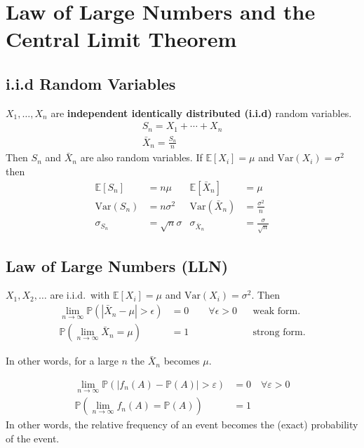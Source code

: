 \newcol{}
\section{Law of Large Numbers and the Central Limit Theorem}

\subsection{i.i.d Random Variables}

$X_1, \ldots , X_n$ are \textbf{independent identically distributed (i.i.d)} random variables.
\begin{gather*}
    S_n = X_1 + \cdots + X_n \\
    \bar{X}_n = \frac{S_n}{n}
\end{gather*}
Then $S_n$ and $ \bar{X}_n$ are also random variables.
\newpar{}
If $\mathbb{E}[X_i]=\mu$ and $\mathrm{Var}(X_i)=\sigma^2$ then
\begin{align*}
    \mathbb{E}[S_n]         & =n\mu                    & 
    \mathbb{E}[\bar{X}_n]   & =\mu                         \\
    \mathrm{Var}(S_n)       & =n\sigma^2               & 
    \mathrm{Var}(\bar{X}_n) & =\frac{\sigma^2}{n}          \\
    \sigma_{S_n}            & =\sqrt{n}\sigma          & 
    \sigma_{\bar{X}_n}      & =\frac{\sigma}{\sqrt{n}}
\end{align*}

\subsection{Law of Large Numbers (LLN)}
$X_1, X_2, \ldots$ are i.i.d.\ with $\mathbb{E}[X_i]=\mu$ and $\mathrm{Var}(X_i)=\sigma^2$. Then
\begin{align*}
    \lim_{n\to\infty}\mathbb{P}\left(\left|\bar{X}_n-\mu\right|>\epsilon\right) & =0 \qquad \forall \epsilon > 0 &  & \text{weak form.}   \\
    \mathbb{P}\left(\lim_{n\to\infty}\bar{X}_n=\mu\right)                       & =1                             &  & \text{strong form.}
\end{align*}

In other words, for a large $n$ the $\bar{X}_n$ becomes $\mu$.

\newpar{}
\begin{align*}
    \lim_{n\to\infty}\mathbb{P}(|f_n(A)-\mathbb{P}(A)|>\varepsilon) & =0\quad \forall \varepsilon>0 \\
    \mathbb{P}\left(\lim_{n\to\infty}f_n(A)=\mathbb{P}(A)\right)    & =1
\end{align*}
In other words, the relative frequency of an event becomes the (exact) probability of the event.


